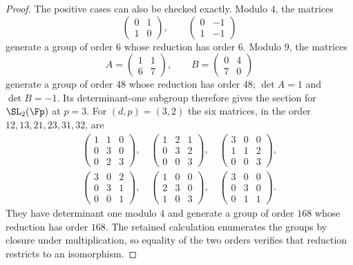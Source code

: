 \begin{proof}
The positive cases can also be checked exactly.  Modulo $4$, the matrices
\[
 \begin{pmatrix}0&1\\1&0\end{pmatrix},\qquad
 \begin{pmatrix}0&-1\\1&-1\end{pmatrix}
\]
generate a group of order $6$ whose reduction has order $6$.  Modulo $9$, the matrices
\[
 A=\begin{pmatrix}1&1\\6&7\end{pmatrix},\qquad
 B=\begin{pmatrix}0&4\\7&0\end{pmatrix}
\]
generate a group of order $48$ whose reduction has order $48$; $\det A=1$ and $\det B=-1$.  Its determinant-one subgroup therefore gives the section for $\SL_2(\Fp)$ at $p=3$.  For $(d,p)=(3,2)$ the six matrices, in the order $12,13,21,23,31,32$, are
\[
\begin{gathered}
\begin{pmatrix}1&1&0\\0&3&0\\0&2&3\end{pmatrix},\quad
\begin{pmatrix}1&2&1\\0&3&2\\0&0&3\end{pmatrix},\quad
\begin{pmatrix}3&0&0\\1&1&2\\0&0&3\end{pmatrix},\\
\begin{pmatrix}3&0&2\\0&3&1\\0&0&1\end{pmatrix},\quad
\begin{pmatrix}1&0&0\\2&3&0\\1&0&3\end{pmatrix},\quad
\begin{pmatrix}3&0&0\\0&3&0\\0&1&1\end{pmatrix}.
\end{gathered}
\]
They have determinant one modulo $4$ and generate a group of order $168$ whose reduction has order $168$.  The retained calculation enumerates the groups by closure under multiplication, so equality of the two orders verifies that reduction restricts to an isomorphism.


\end{proof}
